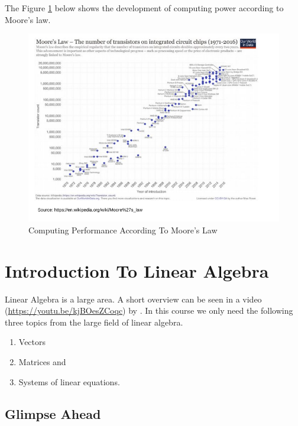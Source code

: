 \documentclass[
]{book}
\providecommand{\tightlist}{%
  \setlength{\itemsep}{0pt}\setlength{\parskip}{0pt}}
\begin{document}
The Figure \ref{fig:moorelaw} below shows the development of computing power according to Moore's law.

\begin{figure}[!ht]
\includegraphics[width=7.42in,]{odg/moorelaw} \caption{Computing Performance According To Moore's Law}\label{fig:moorelaw}
\end{figure}

\cleardoublepage

\hypertarget{appendix-appendix}{%
\appendix}


\hypertarget{intro-linalg}{%
\chapter{Introduction To Linear Algebra}\label{intro-linalg}}

Linear Algebra is a large area. A short overview can be seen in a video (\url{https://youtu.be/kjBOesZCoqc}) by \citep{3Blue1Brown2016}. In this course we only need the following three topics from the large field of linear algebra.

\begin{enumerate}
\def\labelenumi{\arabic{enumi}.}
\tightlist
\item
  Vectors
\item
  Matrices and
\item
  Systems of linear equations.
\end{enumerate}

\hypertarget{intro-linalg-glimpse-ahead}{%
\section{Glimpse Ahead}\label{intro-linalg-glimpse-ahead}}
\end{document}
